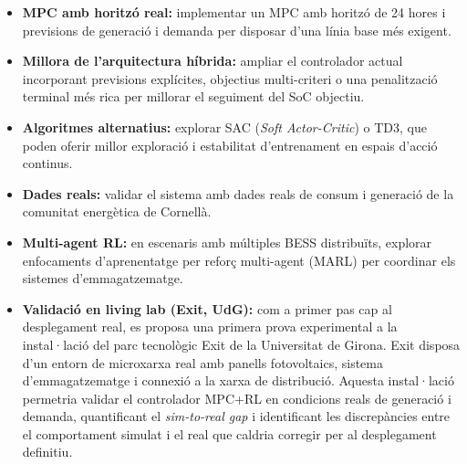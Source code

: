 \documentclass[a4paper,12pt,twoside]{ThesisStyle}
\begin{document}
\begin{itemize}
    \item \textbf{MPC amb horitzó real:} implementar un MPC amb horitzó de 24 hores i previsions de generació i demanda per disposar d'una línia base més exigent.
    \item \textbf{Millora de l'arquitectura híbrida:} ampliar el controlador actual incorporant previsions explícites, objectius multi-criteri o una penalització terminal més rica per millorar el seguiment del SoC objectiu.
    \item \textbf{Algoritmes alternatius:} explorar SAC (\textit{Soft Actor-Critic}) o TD3, que poden oferir millor exploració i estabilitat d'entrenament en espais d'acció continus.
    \item \textbf{Dades reals:} validar el sistema amb dades reals de consum i generació de la comunitat energètica de Cornellà.
    \item \textbf{Multi-agent RL:} en escenaris amb múltiples BESS distribuïts, explorar enfocaments d'aprenentatge per reforç multi-agent (MARL) per coordinar els sistemes d'emmagatzematge.
    \item \textbf{Validació en living lab (Exit, UdG):} com a primer pas cap al desplegament real, es proposa una primera prova experimental a la instal·lació del parc tecnològic Exit de la Universitat de Girona. Exit disposa d'un entorn de microxarxa real amb panells fotovoltaics, sistema d'emmagatzematge i connexió a la xarxa de distribució. Aquesta instal·lació permetria validar el controlador MPC+RL en condicions reals de generació i demanda, quantificant el \textit{sim-to-real gap} i identificant les discrepàncies entre el comportament simulat i el real que caldria corregir per al desplegament definitiu.
\end{itemize}


\backmatter



\end{document}
